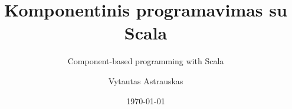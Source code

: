 \documentclass[]{beamer}
\title{Komponentinis programavimas su Scala}
\subtitle{Component-based programming with Scala}
\author{Vytautas Astrauskas}
\institute{
Vilniaus universitetas\\
Matematikos ir informatikos fakultetas\\
Programų sistemų katedra%
}
\date{\today}
\begin{document}
  \frame{\titlepage}


  
\end{document}
